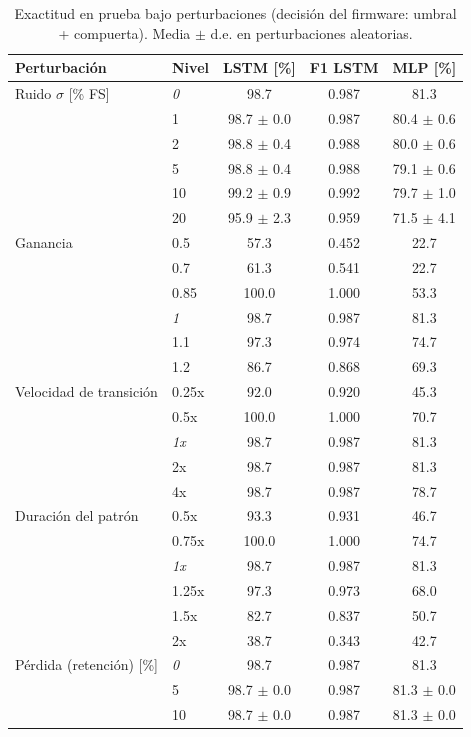 \begin{table}[t]
\centering
\caption{Exactitud en prueba bajo perturbaciones (decisión del firmware: umbral + compuerta). Media $\pm$ d.e. en perturbaciones aleatorias.}
\label{tab:robustez}
\scriptsize
\setlength{\tabcolsep}{3pt}
\begin{tabular}{llccc}
\toprule
Perturbación & Nivel & LSTM [\%] & F1 LSTM & MLP [\%] \\
\midrule
Ruido $\sigma$ [\% FS] & \textit{0} & 98.7 & 0.987 & 81.3 \\
 & 1 & 98.7 $\pm$ 0.0 & 0.987 & 80.4 $\pm$ 0.6 \\
 & 2 & 98.8 $\pm$ 0.4 & 0.988 & 80.0 $\pm$ 0.6 \\
 & 5 & 98.8 $\pm$ 0.4 & 0.988 & 79.1 $\pm$ 0.6 \\
 & 10 & 99.2 $\pm$ 0.9 & 0.992 & 79.7 $\pm$ 1.0 \\
 & 20 & 95.9 $\pm$ 2.3 & 0.959 & 71.5 $\pm$ 4.1 \\
\midrule
Ganancia & 0.5 & 57.3 & 0.452 & 22.7 \\
 & 0.7 & 61.3 & 0.541 & 22.7 \\
 & 0.85 & 100.0 & 1.000 & 53.3 \\
 & \textit{1} & 98.7 & 0.987 & 81.3 \\
 & 1.1 & 97.3 & 0.974 & 74.7 \\
 & 1.2 & 86.7 & 0.868 & 69.3 \\
\midrule
Velocidad de transición & 0.25x & 92.0 & 0.920 & 45.3 \\
 & 0.5x & 100.0 & 1.000 & 70.7 \\
 & \textit{1x} & 98.7 & 0.987 & 81.3 \\
 & 2x & 98.7 & 0.987 & 81.3 \\
 & 4x & 98.7 & 0.987 & 78.7 \\
\midrule
Duración del patrón & 0.5x & 93.3 & 0.931 & 46.7 \\
 & 0.75x & 100.0 & 1.000 & 74.7 \\
 & \textit{1x} & 98.7 & 0.987 & 81.3 \\
 & 1.25x & 97.3 & 0.973 & 68.0 \\
 & 1.5x & 82.7 & 0.837 & 50.7 \\
 & 2x & 38.7 & 0.343 & 42.7 \\
\midrule
Pérdida (retención) [\%] & \textit{0} & 98.7 & 0.987 & 81.3 \\
 & 5 & 98.7 $\pm$ 0.0 & 0.987 & 81.3 $\pm$ 0.0 \\
 & 10 & 98.7 $\pm$ 0.0 & 0.987 & 81.3 $\pm$ 0.0 \\

\end{tabular}
\end{table}
